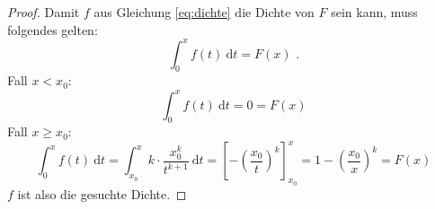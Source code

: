 \documentclass[a4paper]{scrartcl}
\newcommand{\dif}{\ \mathrm{d}}
\def \blattnr {11}
\begin{document}
\begin{enumerate}[label=\bfseries \blattnr.\arabic*]
\begin{enumerate}
\begin{proof}
                    Damit $f$ aus Gleichung \eqref{eq:dichte} die Dichte von
                    $F$ sein kann, muss folgendes gelten:
                    \begin{equation*}
                        \int_0^x f(t) \dif t = F(x)
                        \text{ .}
                    \end{equation*}
                    Fall $x < x_0$:
                    \begin{equation*}
                        \int_0^x f(t) \dif t = 0 = F(x)
                    \end{equation*}
                    Fall $x \geq x_0$:
                    \begin{equation*}
                        \int_0^x f(t) \dif t
                        = \int_{x_0}^x k \cdot \frac{x_0^k}{t^{k+1}} \dif t
                        = \left[ - \left( \frac{x_0}{t} \right)^k \right]_{x_0}^x
                        = 1 - \left( \frac{x_0}{x} \right)^k
                        = F(x)
                    \end{equation*}
                    $f$ ist also die gesuchte Dichte.
                \end{proof}


\end{enumerate}
\end{enumerate}
\end{document}
